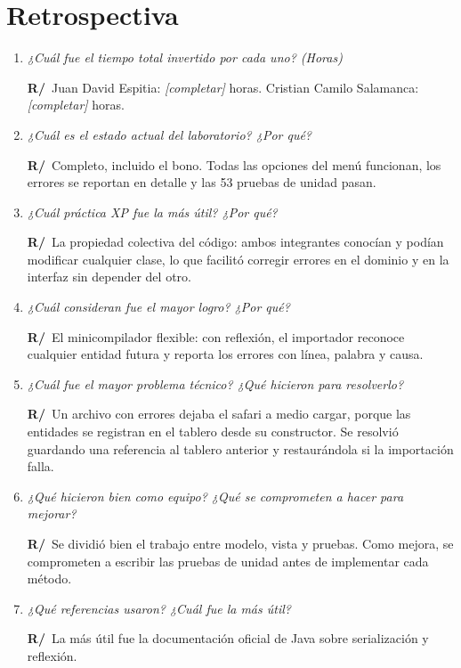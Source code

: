 \documentclass[11pt,letterpaper]{article}
\newcommand{\pregunta}[1]{\textit{#1}\par}
\newcommand{\resp}{\textbf{R/}~}
\begin{document}
\section{Retrospectiva}

\begin{enumerate}
  \item \pregunta{¿Cuál fue el tiempo total invertido por cada uno? (Horas)}
  \resp Juan David Espitia: \textit{[completar]} horas. Cristian Camilo Salamanca: \textit{[completar]} horas.

  \item \pregunta{¿Cuál es el estado actual del laboratorio? ¿Por qué?}
  \resp Completo, incluido el bono. Todas las opciones del menú funcionan, los errores se reportan en detalle y las 53 pruebas de unidad pasan.

  \item \pregunta{¿Cuál práctica XP fue la más útil? ¿Por qué?}
  \resp La propiedad colectiva del código: ambos integrantes conocían y podían modificar cualquier clase, lo que facilitó corregir errores en el dominio y en la interfaz sin depender del otro.

  \item \pregunta{¿Cuál consideran fue el mayor logro? ¿Por qué?}
  \resp El minicompilador flexible: con reflexión, el importador reconoce cualquier entidad futura y reporta los errores con línea, palabra y causa.

  \item \pregunta{¿Cuál fue el mayor problema técnico? ¿Qué hicieron para resolverlo?}
  \resp Un archivo con errores dejaba el safari a medio cargar, porque las entidades se registran en el tablero desde su constructor. Se resolvió guardando una referencia al tablero anterior y restaurándola si la importación falla.

  \item \pregunta{¿Qué hicieron bien como equipo? ¿Qué se comprometen a hacer para mejorar?}
  \resp Se dividió bien el trabajo entre modelo, vista y pruebas. Como mejora, se comprometen a escribir las pruebas de unidad antes de implementar cada método.

  \item \pregunta{¿Qué referencias usaron? ¿Cuál fue la más útil?}
  \resp La más útil fue la documentación oficial de Java sobre serialización y reflexión.
\end{enumerate}
\end{document}
